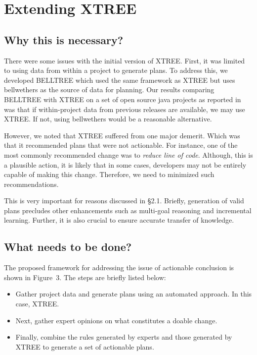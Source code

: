 \documentclass[sigconf, proceedings, 9pt]{acmart}
\begin{document}
\section{Extending XTREE}
\subsection{Why this is necessary?} 
There were some issues with the initial version of XTREE. First, it was limited 
to using data from within a project to generate plans. To address this, we 
developed BELLTREE which used the same framework as XTREE but uses bellwethers 
as the source of data for planning. Our results comparing BELLTREE with XTREE 
on a set of open source java projects as reported in ~\cite{belltree17} was 
that if within-project data from previous releases are 
available, we may use XTREE. If not, using bellwethers would be a reasonable 
alternative. 

However, we noted that XTREE suffered from one major demerit. Which was that it 
recommended plans that were not actionable. For instance, one of the most 
commonly recommended change was to \textit{reduce line of code}. Although, this 
is a plausible action, it is likely that in some cases, developers may not be 
entirely capable of making this change. Therefore, we need to minimized such 
recommendations.

This is very important for reasons discussed in \S2.1. Briefly, generation of 
valid plans precludes other enhancements such as multi-goal reasoning and 
incremental learning. Further, it is also crucial to ensure accurate transfer 
of knowledge.

\subsection{What needs to be done?}
The proposed framework for addressing the issue of actionable conclusion is 
shown in Figure~3. The steps are briefly listed below:
\begin{itemize}
	\item Gather project data and generate plans using an automated approach. In 
	this case, XTREE.
	\item Next, gather expert opinions on what constitutes a doable change.
	\item Finally, combine the rules generated by experts and those generated by 
	XTREE to generate a set of actionable plans.
\end{itemize}  
\end{document}

